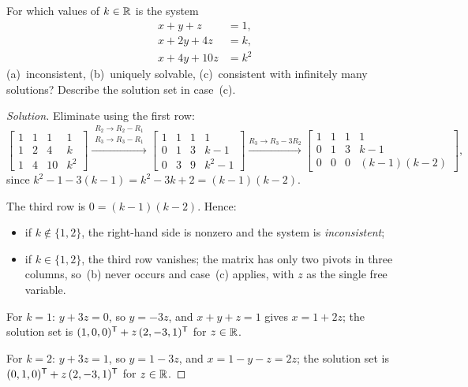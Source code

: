 \begin{problem}
\label{prob:gauss-parameter}
For which values of $k \in \mathbb{R}$ is the system
\[
  \begin{aligned}
    x + y + z &= 1, \\
    x + 2y + 4z &= k, \\
    x + 4y + 10z &= k^2
  \end{aligned}
\]
(a)~inconsistent, (b)~uniquely solvable, (c)~consistent with infinitely
many solutions? Describe the solution set in case~(c).
\end{problem}

\begin{proof}[Solution]
Eliminate using the first row:
\[
  \left[\begin{array}{rrr|c}
    1 & 1 &  1 & 1 \\
    1 & 2 &  4 & k \\
    1 & 4 & 10 & k^2
  \end{array}\right]
  \xrightarrow{\substack{R_2 \to R_2 - R_1 \\ R_3 \to R_3 - R_1}}
  \left[\begin{array}{rrr|c}
    1 & 1 & 1 & 1     \\
    0 & 1 & 3 & k - 1 \\
    0 & 3 & 9 & k^2 - 1
  \end{array}\right]
  \xrightarrow{R_3 \to R_3 - 3R_2}
  \left[\begin{array}{rrr|c}
    1 & 1 & 1 & 1     \\
    0 & 1 & 3 & k - 1 \\
    0 & 0 & 0 & (k - 1)(k - 2)
  \end{array}\right],
\]
since $k^2 - 1 - 3(k - 1) = k^2 - 3k + 2 = (k - 1)(k - 2)$.

The third row is $0 = (k - 1)(k - 2)$. Hence:
\begin{itemize}
  \item if $k \notin \{1, 2\}$, the right-hand side is nonzero and the
        system is \emph{inconsistent};
  \item if $k \in \{1, 2\}$, the third row vanishes; the matrix has
        only two pivots in three columns, so~(b) never occurs and
        case~(c) applies, with $z$ as the single free variable.
\end{itemize}
For $k = 1$: $y + 3z = 0$, so $y = -3z$, and $x + y + z = 1$ gives
$x = 1 + 2z$; the solution set is
$(1, 0, 0)^{\mathsf{T}} + z\,(2, -3, 1)^{\mathsf{T}}$ for $z \in \mathbb{R}$.

For $k = 2$: $y + 3z = 1$, so $y = 1 - 3z$, and $x = 1 - y - z = 2z$;
the solution set is $(0, 1, 0)^{\mathsf{T}} + z\,(2, -3, 1)^{\mathsf{T}}$ for $z \in \mathbb{R}$.
\end{proof}
